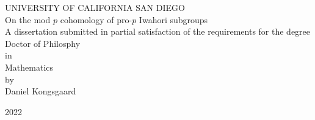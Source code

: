 \begin{titlingpage}
  {
    \centering
    {\Large UNIVERSITY OF CALIFORNIA SAN DIEGO} \\[2em]
    {\Large On the mod \texorpdfstring{$p$}{p} cohomology of pro-\texorpdfstring{$p$}{p} Iwahori subgroups} \\[2em]
    {\Large A dissertation submitted in partial satisfaction of the requirements for the degree Doctor of Philosphy} \\[2em]
    {\Large in} \\[2em]
    {\Large Mathematics} \\[2em]
    {\Large by} \\[2em]
    {\Large Daniel Kongsgaard} \\[2.5em]
  }

  \vfill

  \begin{center}
    \Large 2022
  \end{center}
\end{titlingpage}


